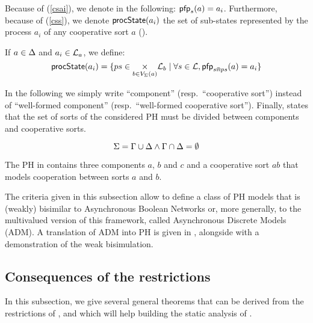 Because of (\ref{csai}), we denote in the following: $\mathsf{pfp}_s(a) = a_i$.
Furthermore, because of (\ref{css}), we denote $\mathsf{procState}(a_i)$ the set of sub-states represented by the process $a_i$ of any cooperative sort $a$ ().
\begin{definition}[$\csState : \PHproc \rightarrow \powerset(\PHproc)$]
\label{def:csState}
  If $a \in \Delta$ and $a_i \in \mathcal{L}_a$, we define:
  $$\mathsf{procState}(a_i) = \{ ps \in \underset{b \in V_\Sigma(a)}{\times} \mathcal{L}_b \mid \forall s \in \mathcal{L}, \mathsf{pfp}_{s \Cap ps}(a) = a_i \}$$
\end{definition}

In the following we simply write “component” (resp.~“cooperative sort”) instead of “well-formed component” (resp.~“well-formed cooperative sort”).
Finally,  states that the set of sorts of the considered PH must be divided between components and cooperative sorts.
\begin{criterion}
\label{cr:compcs}
  $$\Sigma = \Gamma \cup \Delta \wedge \Gamma \cap \Delta = \emptyset$$
\end{criterion}

\begin{example}
  The PH in  contains three components $a$, $b$ and $c$ and a cooperative sort $ab$ that models cooperation between sorts $a$ and $b$.
\end{example}

The criteria given in this subsection allow to define a class of PH models that is (weakly) bisimilar to Asynchronous Boolean Networks
or, more generally, to the multivalued version of this framework, called Asynchronous Discrete Models (ADM).
A translation of ADM into PH is given in , alongside with a demonstration of the weak bisimulation.



\subsection{Consequences of the restrictions}

In this subsection, we give several general theorems that can be derived from the restrictions of ,
and which will help building the static analysis of .

